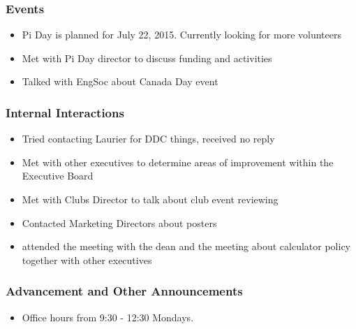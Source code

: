 \subsubsection*{Events}
\begin{itemize}
\item Pi Day is planned for July 22, 2015. Currently looking for more volunteers
\item Met with Pi Day director to discuss funding and activities
\item Talked with EngSoc about Canada Day event
\end{itemize}

\subsubsection*{Internal Interactions}
\begin{itemize}
\item Tried contacting Laurier for DDC things, received no reply
\item Met with other executives to determine areas of improvement within the Executive Board
\item Met with Clubs Director to talk about club event reviewing
\item Contacted Marketing Directors about posters
\item attended the meeting with the dean and the meeting about calculator policy
together with other executives
\end{itemize}

\subsubsection*{Advancement and Other Announcements}
\begin{itemize}
\item Office hours from 9:30 - 12:30 Mondays. 
\end{itemize}
